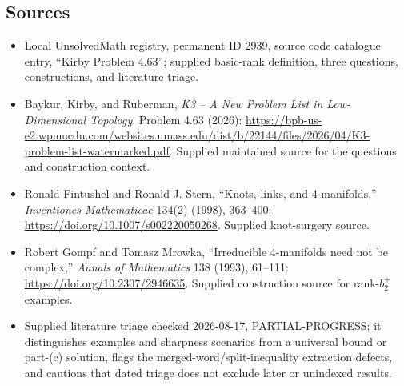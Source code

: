 \documentclass[11pt]{article}
\begin{document}
\subsection{Sources}
\begin{itemize}
\item Local UnsolvedMath registry, permanent ID 2939, source code catalogue entry, ``Kirby Problem 4.63''; supplied basic-rank definition, three questions, constructions, and literature triage.
\item Baykur, Kirby, and Ruberman, \emph{K3 -- A New Problem List in Low-Dimensional Topology}, Problem 4.63 (2026): \url{https://bpb-us-e2.wpmucdn.com/websites.umass.edu/dist/b/22144/files/2026/04/K3-problem-list-watermarked.pdf}. Supplied maintained source for the questions and construction context.
\item [FS98] Ronald Fintushel and Ronald J. Stern, ``Knots, links, and 4-manifolds,'' \emph{Inventiones Mathematicae} 134(2) (1998), 363--400: \url{https://doi.org/10.1007/s002220050268}. Supplied knot-surgery source.
\item [GM93] Robert Gompf and Tomasz Mrowka, ``Irreducible 4-manifolds need not be complex,'' \emph{Annals of Mathematics} 138 (1993), 61--111: \url{https://doi.org/10.2307/2946635}. Supplied construction source for rank-$b_2^+$ examples.
\item Supplied literature triage checked 2026-08-17, PARTIAL-PROGRESS; it distinguishes examples and sharpness scenarios from a universal bound or part-(c) solution, flags the merged-word/split-inequality extraction defects, and cautions that dated triage does not exclude later or unindexed results.
\end{itemize}
\end{document}
